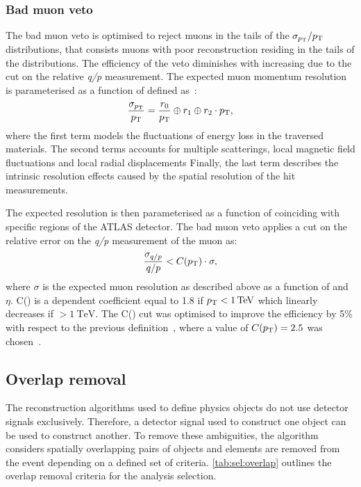 \subsubsection{Bad muon veto}\label{sec:selmm:badmuon}
The bad muon veto is optimised to reject muons in the tails of the $\sigma_{p_{\text{T}}}/p_{\text{T}}$ distributions, that consists muons with poor reconstruction residing in the tails of the \pt distributions. The efficiency of the veto diminishes with increasing \pt due to the cut on the relative \emph{q/p} measurement. The expected muon momentum resolution is parameterised as a function of \pt defined as~\cite{Aad:2016jkr}:
\begin{equation}
   \frac{\sigma_{p_{\text{T}}}}{p_{\text{T}}} = \frac{r_0}{p_{\text{T}}} \oplus r_1 \oplus r_2 \cdot p_{\text{T}},
\end{equation}
where the first term models the fluctuations of energy loss in the traversed materials. The second terms accounts for multiple scatterings, local magnetic field fluctuations and local radial displacements Finally, the last term describes the intrinsic resolution effects caused by the spatial resolution of the hit measurements. 

The expected resolution is then parameterised as a function of \pt coinciding with specific regions of the ATLAS detector. The bad muon veto applies a cut on the relative error on the \emph{q/p} measurement of the muon as: 
\begin{equation}
    \frac{\sigma_{q/p}}{q/p} < C(p_{\text{T}}) \cdot \sigma,
 \end{equation}
where $\sigma$ is the expected muon resolution as described above as a function of \pt and $\eta$. C(\pt) is a \pt dependent coefficient equal to 1.8 if $\pt < \SI{1}{\tera\electronvolt}$ which linearly decreases if \pt $> \SI{1}{\tera\electronvolt}$. The C(\pt) cut was optimised to improve the efficiency by 5\% with respect to the previous definition~\cite{EXOT-2016-05}, where a value of $C(p_{\text{T}}) = 2.5$ was chosen~\cite{Aad:2019fac}. 

\subsection{Overlap removal}
The reconstruction algorithms used to define physics objects do not use detector signals exclusively. Therefore, a detector signal used to construct one object can be used to construct another. To remove these ambiguities, the algorithm considers spatially overlapping pairs of objects and elements are removed from the event depending on a defined set of criteria. \cref{tab:sel:overlap} outlines the overlap removal criteria for the analysis selection. 

